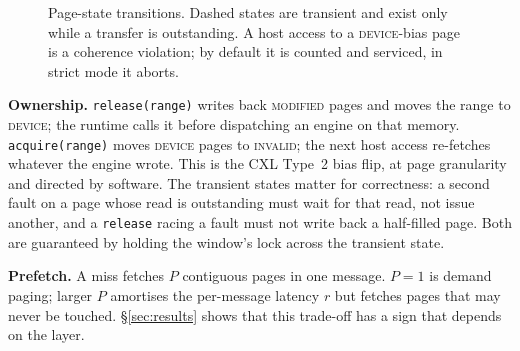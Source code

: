 \documentclass[lettersize,journal]{IEEEtran}
\begin{document}
\begin{figure}[t]\centering
{}
\caption{Page-state transitions. Dashed states are transient and exist only while a transfer is outstanding. A host access to a \textsc{device}-bias page is a coherence violation; by default it is counted and serviced, in strict mode it aborts.}
\label{fig:states}\end{figure}

\textbf{Ownership.} \texttt{release(range)} writes back \textsc{modified} pages and moves the range to \textsc{device}; the runtime calls it before dispatching an engine on that memory. \texttt{acquire(range)} moves \textsc{device} pages to \textsc{invalid}; the next host access re-fetches whatever the engine wrote. This is the CXL Type~2 bias flip, at page granularity and directed by software. The transient states matter for correctness: a second fault on a page whose read is outstanding must wait for that read, not issue another, and a \texttt{release} racing a fault must not write back a half-filled page. Both are guaranteed by holding the window's lock across the transient state.

\textbf{Prefetch.} A miss fetches $P$ contiguous pages in one message. $P{=}1$ is demand paging; larger $P$ amortises the per-message latency $r$ but fetches pages that may never be touched. \S\ref{sec:results} shows that this trade-off has a sign that depends on the layer.
\end{document}
